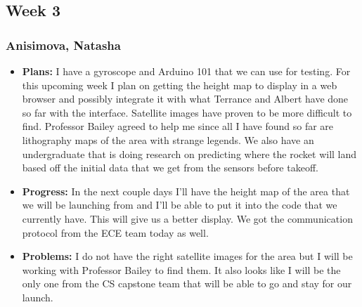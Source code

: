 \documentclass[10pt,draftclsnofoot,onecolumn]{IEEEtran}
\begin{document}
\subsection{Week 3}
\subsubsection{Anisimova, Natasha}
\begin{itemize}
	\item \textbf{Plans: }
	I have a gyroscope and Arduino 101 that we can use for testing. For this upcoming week I plan on getting the height map to display in a web browser and possibly integrate it with what Terrance and Albert have done so far with the interface. Satellite images have proven to be more difficult to find. Professor Bailey agreed to help me since all I have found so far are lithography maps of the area with strange legends. We also have an undergraduate that is doing research on predicting where the rocket will land based off the initial data that we get from the sensors before takeoff.
	\item \textbf{Progress: }
	In the next couple days I'll have the height map of the area that we will be launching from and I'll be able to put it into the code that we currently have. This will give us a better display. We got the communication protocol from the ECE team today as well.
	\item \textbf{Problems: }
	I do not have the right satellite images for the area but I will be working with Professor Bailey to find them. It also looks like I will be the only one from the CS capstone team that will be able to go and stay for our launch.
\end{itemize}
\end{document}

